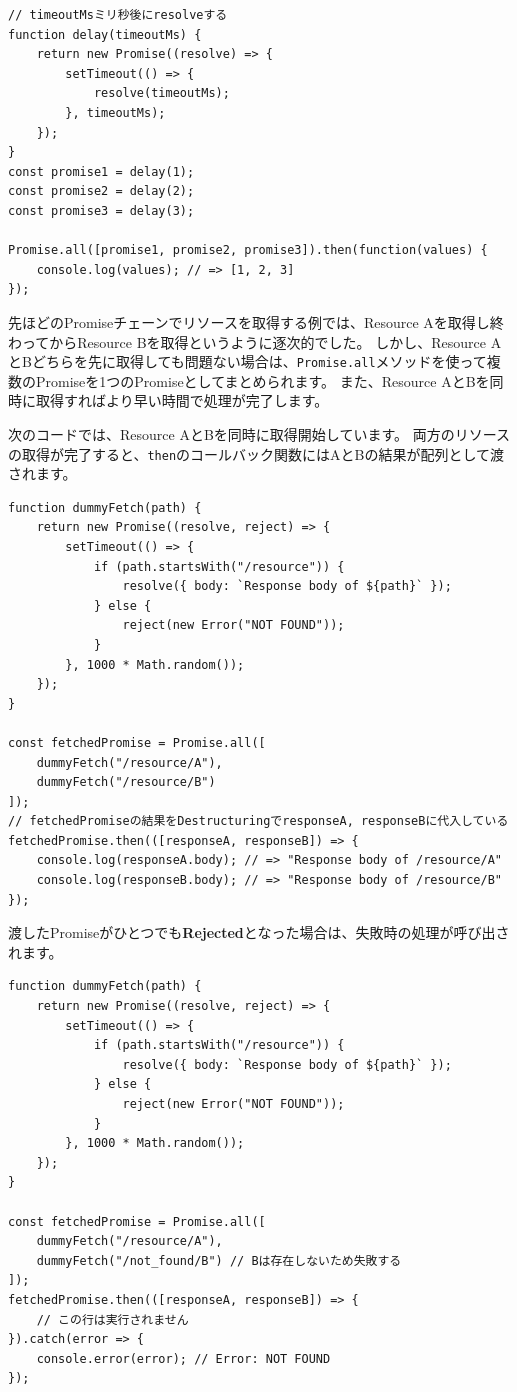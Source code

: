 \begin{lstlisting}
// timeoutMsミリ秒後にresolveする
function delay(timeoutMs) {
    return new Promise((resolve) => {
        setTimeout(() => {
            resolve(timeoutMs);
        }, timeoutMs);
    });
}
const promise1 = delay(1);
const promise2 = delay(2);
const promise3 = delay(3);

Promise.all([promise1, promise2, promise3]).then(function(values) {
    console.log(values); // => [1, 2, 3]
});
\end{lstlisting}

先ほどのPromiseチェーンでリソースを取得する例では、Resource
Aを取得し終わってからResource Bを取得というように逐次的でした。
しかし、Resource
AとBどちらを先に取得しても問題ない場合は、\texttt{Promise.all}メソッドを使って複数のPromiseを1つのPromiseとしてまとめられます。
また、Resource AとBを同時に取得すればより早い時間で処理が完了します。

次のコードでは、Resource AとBを同時に取得開始しています。
両方のリソースの取得が完了すると、\texttt{then}のコールバック関数にはAとBの結果が配列として渡されます。

\begin{lstlisting}
function dummyFetch(path) {
    return new Promise((resolve, reject) => {
        setTimeout(() => {
            if (path.startsWith("/resource")) {
                resolve({ body: `Response body of ${path}` });
            } else {
                reject(new Error("NOT FOUND"));
            }
        }, 1000 * Math.random());
    });
}

const fetchedPromise = Promise.all([
    dummyFetch("/resource/A"),
    dummyFetch("/resource/B")
]);
// fetchedPromiseの結果をDestructuringでresponseA, responseBに代入している
fetchedPromise.then(([responseA, responseB]) => {
    console.log(responseA.body); // => "Response body of /resource/A"
    console.log(responseB.body); // => "Response body of /resource/B"
});
\end{lstlisting}

渡したPromiseがひとつでも\textbf{Rejected}となった場合は、失敗時の処理が呼び出されます。

\begin{lstlisting}
function dummyFetch(path) {
    return new Promise((resolve, reject) => {
        setTimeout(() => {
            if (path.startsWith("/resource")) {
                resolve({ body: `Response body of ${path}` });
            } else {
                reject(new Error("NOT FOUND"));
            }
        }, 1000 * Math.random());
    });
}

const fetchedPromise = Promise.all([
    dummyFetch("/resource/A"),
    dummyFetch("/not_found/B") // Bは存在しないため失敗する
]);
fetchedPromise.then(([responseA, responseB]) => {
    // この行は実行されません
}).catch(error => {
    console.error(error); // Error: NOT FOUND
});
\end{lstlisting}

